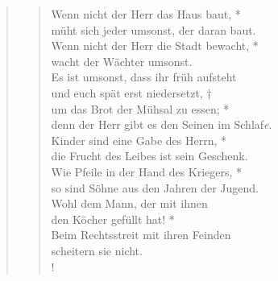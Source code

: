 \begin{quote}
\begin{verse}





Wenn nicht der Herr das Haus baut, *\\
müht sich jeder umsonst, der daran baut.\\
\vin Wenn nicht der Herr die Stadt bewacht, *\\
\vin wacht der Wächter umsonst.\\
Es ist umsonst, dass ihr früh aufsteht\\
und euch spät erst niedersetzt, †\\
um das Brot der Mühsal zu essen; *\\
denn der Herr gibt es den Seinen im Schlaf\textit{e}.\\
\vin Kinder sind eine Gabe des Herrn, *\\
\vin die Frucht des Leibes ist sein Geschenk.\\
Wie Pfeile in der Hand des Kriegers, *\\
so sind Söhne aus den Jahren der Jugend.\\
\vin Wohl dem Mann, der mit ihnen\\ 
\vin den Köcher gefüllt hat! *\\
\vin Beim Rechtsstreit mit ihren Feinden\\ 
\vin scheitern sie nicht.\\!
\end{verse}

 \end{quote}
